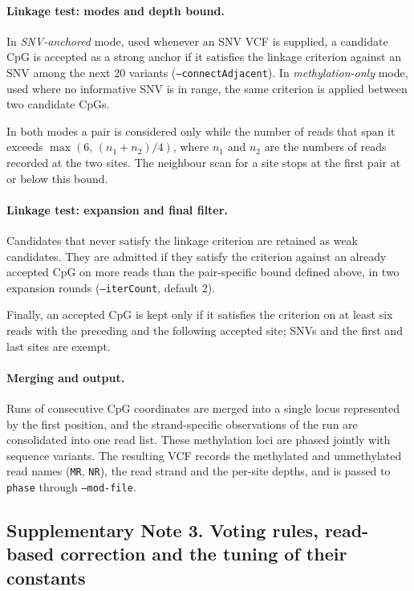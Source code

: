 \documentclass[11pt,a4paper]{article}
\newcommand{\code}[1]{\texttt{\small #1}}
\begin{document}
\paragraph{Linkage test: modes and depth bound.} In \emph{SNV-anchored} mode, used whenever an SNV VCF is supplied, a candidate CpG is accepted as a strong anchor if it satisfies the linkage criterion against an SNV among the next 20 variants (\code{--connectAdjacent}). In \emph{methylation-only} mode, used where no informative SNV is in range, the same criterion is applied between two candidate CpGs.

In both modes a pair is considered only while the number of reads that span it exceeds $\max(6,\,(n_1+n_2)/4)$, where $n_1$ and $n_2$ are the numbers of reads recorded at the two sites. The neighbour scan for a site stops at the first pair at or below this bound.

\paragraph{Linkage test: expansion and final filter.} Candidates that never satisfy the linkage criterion are retained as weak candidates. They are admitted if they satisfy the criterion against an already accepted CpG on more reads than the pair-specific bound defined above, in two expansion rounds (\code{--iterCount}, default 2).

Finally, an accepted CpG is kept only if it satisfies the criterion on at least six reads with the preceding and the following accepted site; SNVs and the first and last sites are exempt.

\paragraph{Merging and output.} Runs of consecutive CpG coordinates are merged into a single locus represented by the first position, and the strand-specific observations of the run are consolidated into one read list. These methylation loci are phased jointly with sequence variants. The resulting VCF records the methylated and unmethylated read names (\code{MR}, \code{NR}), the read strand and the per-site depths, and is passed to \code{phase} through \code{--mod-file}.

\subsection*{Supplementary Note 3. Voting rules, read-based correction and the tuning of their constants}
\end{document}
